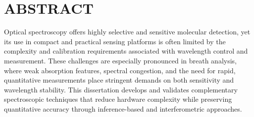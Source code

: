 %
%
%
%
%

\chapter*{ABSTRACT}

\pagestyle{plain} %
\setcounter{page}{2}

\indent
Optical spectroscopy offers highly selective and sensitive molecular detection, yet its use in compact and practical sensing platforms is often limited by the complexity and calibration requirements associated with wavelength control and measurement. These challenges are especially pronounced in breath analysis, where weak absorption features, spectral congestion, and the need for rapid, quantitative measurements place stringent demands on both sensitivity and wavelength stability. This dissertation develops and validates complementary spectroscopic techniques that reduce hardware complexity while preserving quantitative accuracy through inference-based and interferometric approaches.


